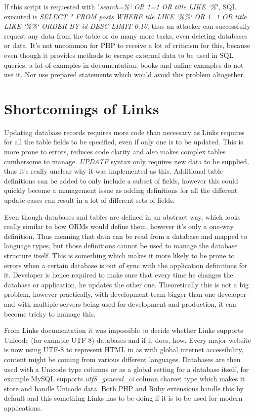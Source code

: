 If this script is requested with "\textit{search=\%` OR 1=1 OR title LIKE `\%}", SQL executed is \textit{SELECT * FROM posts WHERE tile LIKE `\%\%` OR 1=1 OR title LIKE `\%\%` ORDER BY id DESC LIMIT 0,10}, thus an attacker can successfully request any data from the table or do many more tasks, even deleting databases or data. It's not uncommon for PHP to receive a lot of criticism for this, because even though it provides methods to escape external data to be used in SQL queries, a lot of examples in documentation, books and online examples do not use it. Nor use prepared statements which would avoid this problem altogether.

\section{Shortcomings of Links}

Updating database records requires more code than necessary as Links requires for all the table fields to be specified, even if only one is to be updated. This is more prone to errors, reduces code clarity and also makes complex tables cumbersome to manage. \textit{UPDATE} syntax only requires new data to be supplied, thus it's really unclear why it was implemented as this. Additional table definitions can be added to only include a subset of fields, however this could quickly become a management issue as adding definitions for all the different update cases can result in a lot of different sets of fields.

Even though databases and tables are defined in an abstract way, which looks really similar to how ORMs would define them, however it's only a one-way definition. Thus meaning that data can be read from a database and mapped to language types, but those definitions cannot be used to manage the database structure itself. This is something which makes it more likely to be prone to errors when a certain database is out of sync with the application definitions for it. Developer is hence required to make sure that every time he changes the database or application, he updates the other one. Theoretically this is not a big problem, however practically, with development team bigger than one developer and with multiple servers being used for development and production, it can become tricky to manage this. 

From Links documentation it was impossible to decide whether Links supports Unicode (for example UTF-8) databases and if it does, how. Every major website is now using UTF-8 to represent HTML in as with global internet accessibility, content might be coming from various different languages. Databases are then used with a Unicode type columns or as a global setting for a database itself, for example MySQL supports \textit{utf8\_general\_ci} column charset type which makes it store and handle Unicode data. Both PHP and Ruby extensions handle this by default and this something Links has to be doing if it is to be used for modern applications.


